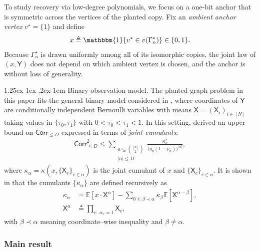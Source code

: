 \documentclass[12pt]{article}
\makeatletter
\newcommand{\Ind}{\mathbbm{1}}
\newcommand{\s}[1]{\mathsf{#1}}
\renewcommand{\paragraph}{%
  \@startsection{paragraph}{4}%
  {\z@}{1.25ex \@plus 1ex \@minus .2ex}{-1em}%
  {\normalfont\normalsize\bfseries}%
}
\makeatother
\begin{document}
To study recovery via low-degree polynomials, we focus on a one-bit anchor that is symmetric across the vertices of the planted copy. Fix an \emph{ambient anchor vertex} $v^\star=\{1\}$ and define
\begin{align}\label{eq:x-edge-anchor}
x\triangleq\Ind\{v^\star\in v(\Gamma_n^\star)\}\in\{0,1\}.
\end{align}
Because $\Gamma_n^\star$ is drawn uniformly among all of its isomorphic copies, the joint law of $(x,\s{Y})$ does not depend on which ambient vertex is chosen, and the anchor is without loss of generality. %

\paragraph{Binary observation model.} The planted graph problem in this paper fits the general binary model considered in \cite[Sec. 2.3]{SchrammWein2022}, where coordinates of $\s{Y}$ are conditionally independent Bernoulli variables with means $\s{X}=(\s{X}_i)_{i\in[N]}$ taking values in $\{\tau_0,\tau_1\}$ with $0<\tau_0<\tau_1<1$. In this setting, \cite[Thm. 2.7]{SchrammWein2022} derived an upper bound on $\s{Corr}_{\le D}$ expressed in terms of \emph{joint cumulants}:
\begin{align}\label{eq:sw-master}
\s{Corr}_{\le D}^{2}
\le
\sum_{\substack{\alpha\subseteq\binom{[n]}{2}\\ |\alpha|\le D}}
\frac{\kappa_\alpha^{  2}}{\big(q_n(1-p_n)\big)^{|\alpha|}},
\end{align}
where $\kappa_\alpha=\kappa(x,\{\s{X}_e\}_{e\in\alpha})$ is the joint cumulant of $x$ and $\{\s{X}_e\}_{e\in\alpha}$. It is shown in \cite[Thm. 2.7]{SchrammWein2022} that the cumulants $\{\kappa_\alpha\}$ are defined recursively as
\begin{align}\label{eq:cumulant-recursion}
\kappa_\alpha
&=\mathbb{E}[x\cdot\s{X}^\alpha]
-\sum_{0\leq \beta\prec\alpha}
\kappa_\beta\mathbb{E}[\s{X}^{\alpha-\beta}],\\
\s{X}^\alpha&\triangleq\prod_{e:\;\alpha_e=1}\s{X}_e,
\end{align}
with $\beta\prec\alpha$ meaning coordinate--wise inequality and $\beta\neq\alpha$.

\subsubsection{Main result}
\end{document}

